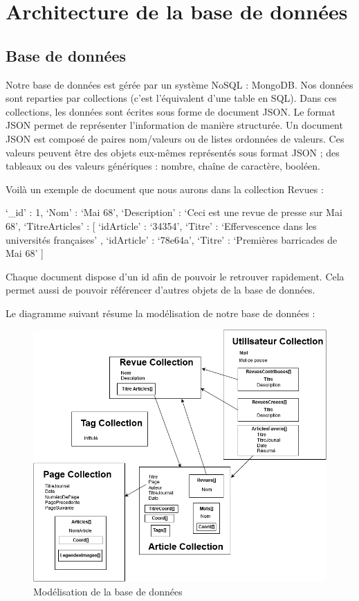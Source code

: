 \newpage
\section{Architecture de la base de données}
\label{sec:bdd}

\subsection{Base de données}

Notre base de données est gérée par un système NoSQL : MongoDB. Nos données sont reparties par collections (c’est l’équivalent d’une table en SQL). Dans ces collections, les données sont écrites sous forme de document JSON. Le format JSON permet de représenter l’information de manière structurée. Un document JSON est composé de paires nom/valeurs ou de listes ordonnées de valeurs. Ces valeurs peuvent être des objets eux-mêmes représentés sous format JSON ; des tableaux ou des valeurs génériques : nombre, chaîne de caractère, booléen. 


Voilà un exemple de document que nous aurons dans la collection Revues : 


\begin{verbatimtab}[3]
{
	‘_id’ : 1,
	‘Nom’ : ‘Mai 68’,
	‘Description’ : ‘Ceci est une revue de presse sur Mai 68’,
	‘TitreArticles’ : [ 
		{ ‘idArticle’ : ‘34354’, ‘Titre’ : ‘Effervescence dans les universités françaises’ },
		{ ‘idArticle’ : ‘78e64a’,  ‘Titre’ :	‘Premières barricades de Mai 68’ }
  ]
}
\end{verbatimtab}

Chaque document dispose d’un id afin de pouvoir le retrouver rapidement. Cela permet aussi de pouvoir référencer d’autres objets de la base de données. 

Le diagramme suivant résume la modélisation de notre base de données :


\begin{figure}[H]
        \centering
        \includegraphics[scale=0.35]{figure/ModelBDD.png}
            \caption{Modélisation de la base de données}
            \label{fig:modelbdd}
\end{figure}

